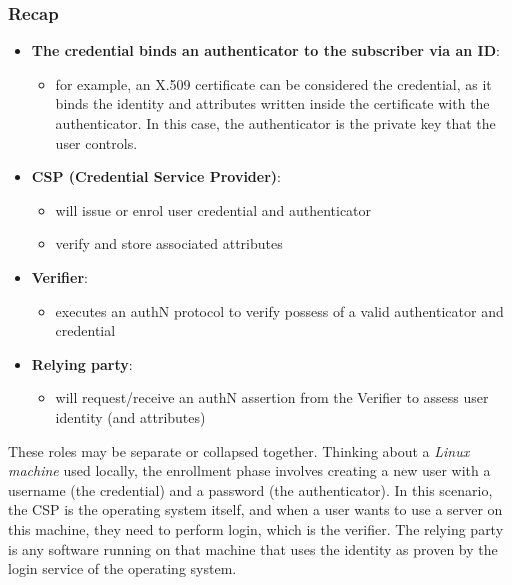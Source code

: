\subsubsection{Recap}
\begin{itemize}
  \item \textbf{The credential binds an authenticator to the subscriber via an ID}:
        \begin{itemize}
          \item for example, an X.509 certificate can be considered the credential, as it binds the identity and attributes written inside the certificate with the authenticator. In this case, the authenticator is the private key that the user controls.
        \end{itemize}
  \item \textbf{CSP (Credential Service Provider)}:
        \begin{itemize}
          \item will issue or enrol user credential and authenticator
          \item verify and store associated attributes
        \end{itemize}
  \item \textbf{Verifier}:
        \begin{itemize}
          \item executes an authN protocol to verify possess of a valid
                authenticator and credential
        \end{itemize}
  \item \textbf{Relying party}:
        \begin{itemize}
          \item will request/receive an authN assertion from the Verifier to
                assess user identity (and attributes)
        \end{itemize}
\end{itemize}


These roles may be separate or collapsed together.
Thinking about a \emph{Linux machine} used locally, the enrollment phase involves creating a new user with a username (the credential) and a password (the authenticator). In this scenario, the CSP is the operating system itself, and when a user wants to use a server on this machine, they need to perform login, which is the verifier. The relying party is any software running on that machine that uses the identity as proven by the login service of the operating system.



